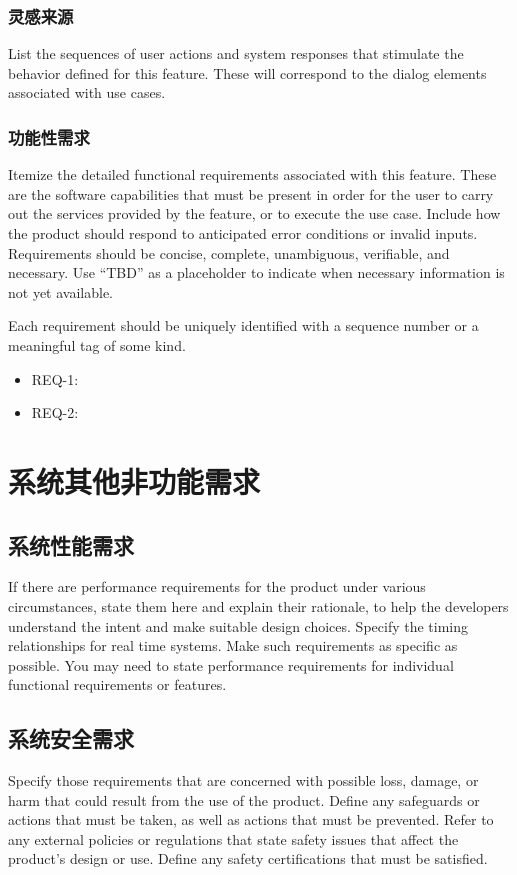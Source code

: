 \documentclass{ctexart}
\begin{document}
\subsubsection{灵感来源}
List the sequences of user actions and system responses that stimulate the 
behavior defined for this feature. These will correspond to the dialog elements 
associated with use cases.

\subsubsection{功能性需求}
Itemize the detailed functional requirements associated with this feature.  
These are the software capabilities that must be present in order for the user 
to carry out the services provided by the feature, or to execute the use case.  
Include how the product should respond to anticipated error conditions or 
invalid inputs. Requirements should be concise, complete, unambiguous, 
verifiable, and necessary. Use ``TBD'' as a placeholder to indicate when necessary 
information is not yet available.

Each requirement should be uniquely identified with a sequence number or a 
meaningful tag of some kind.

\begin{itemize}
    \item REQ-1:
    \item REQ-2:
\end{itemize}



\section{系统其他非功能需求}
\subsection{系统性能需求}
If there are performance requirements for the product under various 
circumstances, state them here and explain their rationale, to help the 
developers understand the intent and make suitable design choices. Specify the 
timing relationships for real time systems. Make such requirements as specific 
as possible. You may need to state performance requirements for individual 
functional requirements or features.


\subsection{系统安全需求}
Specify those requirements that are concerned with possible loss, damage, or 
harm that could result from the use of the product. Define any safeguards or 
actions that must be taken, as well as actions that must be prevented. Refer to 
any external policies or regulations that state safety issues that affect the 
product's design or use. Define any safety certifications that must be 
satisfied.
\end{document}
